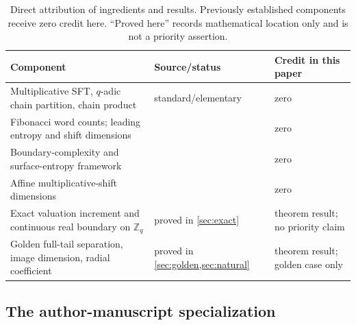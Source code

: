 \begin{table}[t]
  \centering
  \caption{Direct attribution of ingredients and results.  Previously
  established components receive zero credit here.  ``Proved here'' records
  mathematical location only and is not a priority assertion.}
  \label{tab:ownership}
  \small
  \begin{tabularx}{\textwidth}{>{\raggedright\arraybackslash}X
      >{\raggedright\arraybackslash}p{3.8cm}
      >{\raggedright\arraybackslash}p{3.1cm}}
    \toprule
    Component & Source/status & Credit in this paper \\
    \midrule
    Multiplicative SFT, \(q\)-adic chain partition, chain product
      & standard/elementary & zero \\
    Fibonacci word counts; leading entropy and shift dimensions
      & \citet{fan2012level,kenyon2012hausdorff,ban2019pattern} & zero \\
    Boundary-complexity and surface-entropy framework
      & \citet{ban2023boundary} & zero \\
    Affine multiplicative-shift dimensions
      & \citet{ban2025affine} & zero \\
    Exact valuation increment and continuous real boundary on \(\mathbb Z_q\)
      & proved in \cref{sec:exact} & theorem result; no priority claim \\
    Golden full-tail separation, image dimension, radial coefficient
      & proved in \cref{sec:golden,sec:natural} & theorem result; golden case only \\
    \bottomrule
  \end{tabularx}
\end{table}

\subsection{The author-manuscript specialization}
\label{sec:bhl-correction}


